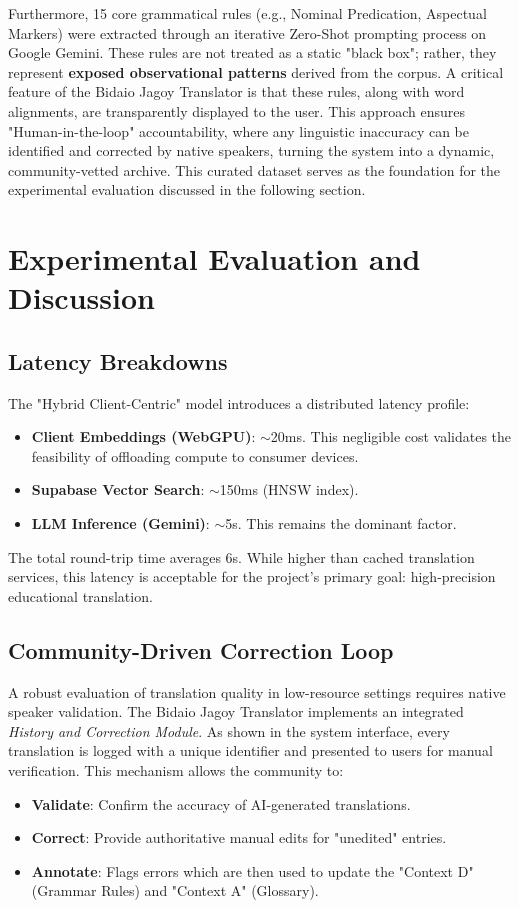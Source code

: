 \documentclass[12pt]{article}
\begin{document}
Furthermore, 15 core grammatical rules (e.g., Nominal Predication, Aspectual Markers) were extracted through an iterative Zero-Shot prompting process on Google Gemini. These rules are not treated as a static "black box"; rather, they represent \textbf{exposed observational patterns} derived from the corpus. A critical feature of the Bidaio Jagoy Translator is that these rules, along with word alignments, are transparently displayed to the user. This approach ensures "Human-in-the-loop" accountability, where any linguistic inaccuracy can be identified and corrected by native speakers, turning the system into a dynamic, community-vetted archive. This curated dataset serves as the foundation for the experimental evaluation discussed in the following section.


\section{Experimental Evaluation and Discussion}

\subsection{Latency Breakdowns}
The "Hybrid Client-Centric" model introduces a distributed latency profile:
\begin{itemize}
    \item \textbf{Client Embeddings (WebGPU)}: $\sim$20ms. This negligible cost validates the feasibility of offloading compute to consumer devices.
    \item \textbf{Supabase Vector Search}: $\sim$150ms (HNSW index).
    \item \textbf{LLM Inference (Gemini)}: $\sim$5s. This remains the dominant factor.
\end{itemize}

The total round-trip time averages 6s. While higher than cached translation services, this latency is acceptable for the project's primary goal: high-precision educational translation.

\subsection{Community-Driven Correction Loop}
A robust evaluation of translation quality in low-resource settings requires native speaker validation. The Bidaio Jagoy Translator implements an integrated \textit{History and Correction Module}. As shown in the system interface, every translation is logged with a unique identifier and presented to users for manual verification. This mechanism allows the community to:
\begin{itemize}
    \item \textbf{Validate}: Confirm the accuracy of AI-generated translations.
    \item \textbf{Correct}: Provide authoritative manual edits for "unedited" entries.
    \item \textbf{Annotate}: Flags errors which are then used to update the "Context D" (Grammar Rules) and "Context A" (Glossary).
\end{itemize}
\end{document}
